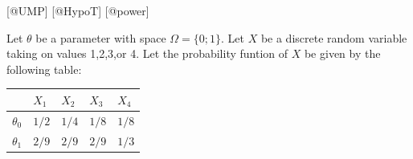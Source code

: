 \documentclass[6pt,Portrait]{article}
\begin{document}
{[}@UMP{]} {[}@HypoT{]} {[}@power{]}

Let \(\theta\) be a parameter with space \(\Omega=\{0; 1\}\). Let \(X\)
be a discrete random variable taking on values 1,2,3,or 4. Let the
probability funtion of \(X\) be given by the following table:

\begin{longtable}[]{@{}lllll@{}}
\toprule
\begin{minipage}[b]{0.13\columnwidth}\raggedright
\strut
\end{minipage} & \begin{minipage}[b]{0.07\columnwidth}\raggedright
\(X_1\)\strut
\end{minipage} & \begin{minipage}[b]{0.07\columnwidth}\raggedright
\(X_2\)\strut
\end{minipage} & \begin{minipage}[b]{0.07\columnwidth}\raggedright
\(X_3\)\strut
\end{minipage} & \begin{minipage}[b]{0.08\columnwidth}\raggedright
\(X_4\)\strut
\end{minipage}\tabularnewline
\midrule
\endhead
\begin{minipage}[t]{0.13\columnwidth}\raggedright
\(\theta_0\)\strut
\end{minipage} & \begin{minipage}[t]{0.07\columnwidth}\raggedright
\(1/2\)\strut
\end{minipage} & \begin{minipage}[t]{0.07\columnwidth}\raggedright
\(1/4\)\strut
\end{minipage} & \begin{minipage}[t]{0.07\columnwidth}\raggedright
\(1/8\)\strut
\end{minipage} & \begin{minipage}[t]{0.08\columnwidth}\raggedright
\(1/8\)\strut
\end{minipage}\tabularnewline
\begin{minipage}[t]{0.13\columnwidth}\raggedright
\(\theta_1\)\strut
\end{minipage} & \begin{minipage}[t]{0.07\columnwidth}\raggedright
\(2/9\)\strut
\end{minipage} & \begin{minipage}[t]{0.07\columnwidth}\raggedright
\(2/9\)\strut
\end{minipage} & \begin{minipage}[t]{0.07\columnwidth}\raggedright
\(2/9\)\strut
\end{minipage} & \begin{minipage}[t]{0.08\columnwidth}\raggedright
\(1/3\)\strut
\end{minipage}\tabularnewline
\bottomrule
\end{longtable}
\end{document}
